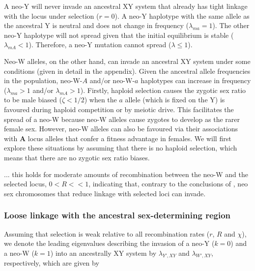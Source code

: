 \documentclass[12pt]{article}
\begin{document}
A neo-Y will never invade an ancestral XY system that already has tight linkage with the locus under selection ($r=0$). 
A neo-Y haplotype with the same allele as the ancestral Y is neutral and does not change in frequency ($\lambda_{ma}=1$).
The other neo-Y haplotype will not spread given that the initial equilibrium is stable ($\lambda_{mA}<1$). 
Therefore, a neo-Y mutation cannot spread ($\lambda \leq 1$).

Neo-W alleles, on the other hand, can invade an ancestral XY system under some conditions (given in detail in the appendix). 
Given the ancestral allele frequencies in the population, neo-W-$A$ and/or neo-W-$a$ haplotypes can increase in frequency ($\lambda_{ma}>1$ and/or $\lambda_{mA}>1$). 
Firstly, haploid selection causes the zygotic sex ratio to be male biased ($\zeta<1/2$) when the $a$ allele (which is fixed on the Y) is favoured during haploid competition or by meiotic drive. 
This facilitates the spread of a neo-W because neo-W alleles cause zygotes to develop as the rarer female sex. 
However, neo-W alleles can also be favoured via their associations with \textbf{A} locus alleles that confer a fitness advantage in females.
We will first explore these situations by assuming that there is no haploid selection, which means that there are no zygotic sex ratio biases.


... this holds for moderate amounts of recombination between the neo-W and the selected locus, $0<R<<1$, indicating that, contrary to the conclusions of \cite{vanDoorn:2010hu}, neo sex chromosomes that reduce linkage with selected loci can invade.

\subsubsection*{Loose linkage with the ancestral sex-determining region}


Assuming that selection is weak relative to all recombination rates ($r$, $R$ and $\chi$), we denote the leading eigenvalues describing the invasion of a neo-Y ($k=0$) and a neo-W ($k=1$) into an ancestrally XY system by $\lambda_{Y',XY}$ and $\lambda_{W',XY}$, respectively, which are given by
\end{document}
